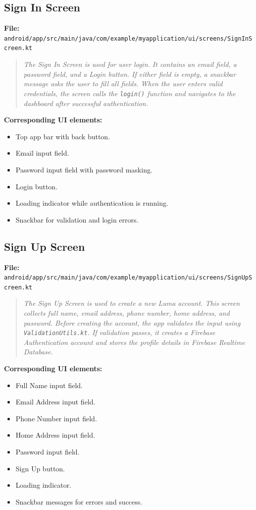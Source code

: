\documentclass[11pt,a4paper]{article}
\begin{document}
\subsection{Sign In Screen}
\textbf{File:} \texttt{android/app/src/main/java/com/example/myapplication/ui/screens/SignInScreen.kt}

\begin{quote}
\textit{The Sign In Screen is used for user login. It contains an email field, a password field, and a Login button. If either field is empty, a snackbar message asks the user to fill all fields. When the user enters valid credentials, the screen calls the \texttt{login()} function and navigates to the dashboard after successful authentication.}
\end{quote}

\textbf{Corresponding UI elements:}
\begin{itemize}
    \item Top app bar with back button.
    \item Email input field.
    \item Password input field with password masking.
    \item Login button.
    \item Loading indicator while authentication is running.
    \item Snackbar for validation and login errors.
\end{itemize}

\subsection{Sign Up Screen}
\textbf{File:} \texttt{android/app/src/main/java/com/example/myapplication/ui/screens/SignUpScreen.kt}

\begin{quote}
\textit{The Sign Up Screen is used to create a new Luma account. This screen collects full name, email address, phone number, home address, and password. Before creating the account, the app validates the input using \texttt{ValidationUtils.kt}. If validation passes, it creates a Firebase Authentication account and stores the profile details in Firebase Realtime Database.}
\end{quote}

\textbf{Corresponding UI elements:}
\begin{itemize}
    \item Full Name input field.
    \item Email Address input field.
    \item Phone Number input field.
    \item Home Address input field.
    \item Password input field.
    \item Sign Up button.
    \item Loading indicator.
    \item Snackbar messages for errors and success.
\end{itemize}
\end{document}
